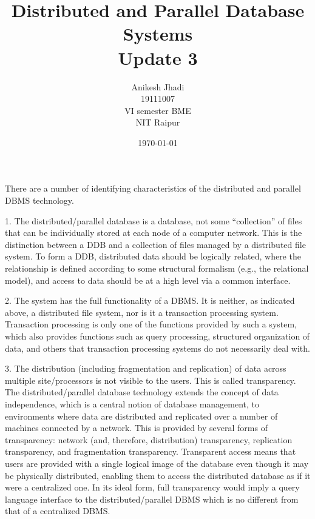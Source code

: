 \documentclass{article}
\title{Distributed and Parallel Database Systems\\Update 3}
\author{Anikesh Jhadi \\19111007 \\VI semester BME \\NIT Raipur}
\date{\today}
\begin{document}
\maketitle


There are a number of identifying characteristics of the distributed and parallel DBMS technology.

1. The distributed/parallel database is a database, not some “collection” of files that can be individually
stored at each node of a computer network. This is the distinction between a DDB and a collection
of files managed by a distributed file system. To form a DDB, distributed data should be logically
related, where the relationship is defined according to some structural formalism (e.g., the relational
model), and access to data should be at a high level via a common interface.

2. The system has the full functionality of a DBMS. It is neither, as indicated above, a distributed file
system, nor is it a transaction processing system. Transaction processing is only one of the functions
provided by such a system, which also provides functions such as query processing, structured
organization of data, and others that transaction processing systems do not necessarily deal with.

3. The distribution (including fragmentation and replication) of data across multiple site/processors is
not visible to the users. This is called transparency. The distributed/parallel database technology
extends the concept of data independence, which is a central notion of database management, to
environments where data are distributed and replicated over a number of machines connected by a
network. This is provided by several forms of transparency: network (and, therefore, distribution)
transparency, replication transparency, and fragmentation transparency. Transparent access means
that users are provided with a single logical image of the database even though it may be physically
distributed, enabling them to access the distributed database as if it were a centralized one. In its
ideal form, full transparency would imply a query language interface to the distributed/parallel DBMS
which is no different from that of a centralized DBMS.
\end{document}
